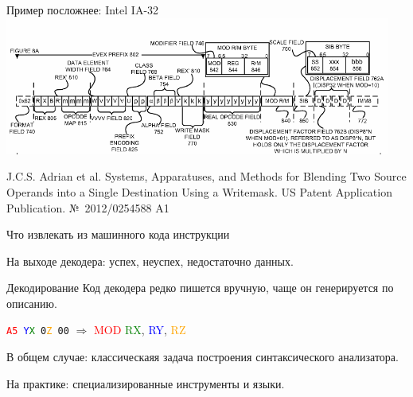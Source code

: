 \documentclass{beamer}
\begin{document}
\begin{frame}{Пример посложнее: Intel IA-32}
\centering
\includegraphics[width=0.95\textwidth]{./ia-32-evex}

\tiny{J.C.S. Adrian et al. Systems, Apparatuses, and Methods for Blending Two Source Operands into a Single Destination Using a Writemask. US Patent Application Publication. №~2012/0254588 A1}

\end{frame}

\begin{frame}{Что извлекать из машинного кода инструкции}
\centering

На выходе декодера: успех, неуспех, недостаточно данных.

\end{frame}







\begin{frame}{Декодирование}
Код декодера редко пишется вручную, чаще он генерируется по описанию.

\texttt{\textcolor{red}{A5} \textcolor{blue}{Y}\textcolor{green}{X} 0\textcolor{orange}{Z} 00} $\Rightarrow$ \textcolor{red}{MOD} \textcolor{green}{RX}, \textcolor{blue}{RY}, \textcolor{orange}{RZ}

В общем случае: классическаяя задача построения  синтаксического анализатора.

На практике: специализированные инструменты и языки.
\end{frame}
\end{document}

